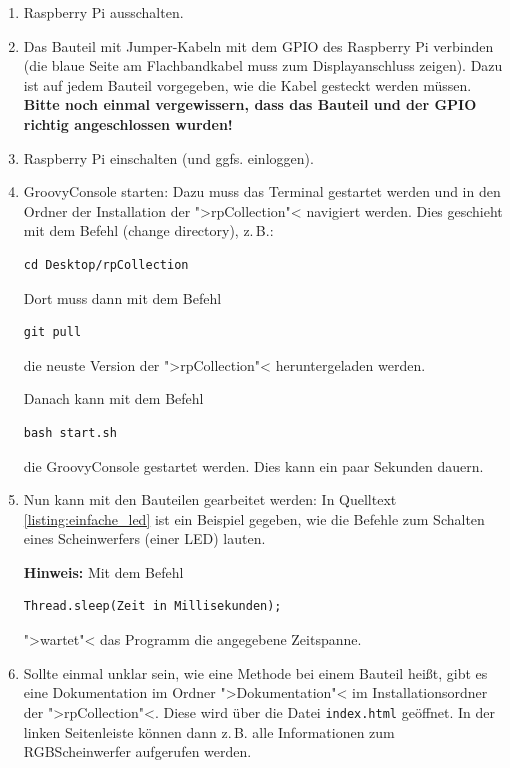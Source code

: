 \documentclass[11pt, a4paper]{article}
\begin{document}
\begin{enumerate}

\item Raspberry Pi ausschalten.

\item Das Bauteil mit Jumper-Kabeln mit dem GPIO des Raspberry Pi verbinden (die blaue Seite am Flachbandkabel muss zum Displayanschluss zeigen). Dazu ist auf jedem Bauteil vorgegeben, wie die Kabel gesteckt werden müssen. \textbf{Bitte noch einmal vergewissern, dass das Bauteil und der GPIO richtig angeschlossen wurden!}

\item Raspberry Pi einschalten (und ggfs. einloggen).

\item GroovyConsole starten: Dazu muss das Terminal gestartet werden und in den Ordner der Installation der ">rpCollection"< navigiert werden. Dies geschieht mit dem Befehl  (change directory), z.\,B.:

\lstset{language=Bash}
\bashstyleoneline 
\begin{lstlisting}
cd Desktop/rpCollection
\end{lstlisting}

Dort muss dann mit dem Befehl 
\begin{lstlisting}
git pull
\end{lstlisting}
die neuste Version der ">rpCollection"< heruntergeladen werden.

Danach kann mit dem Befehl
\lstset{language=Bash}
\bashstyleoneline
\begin{lstlisting}
bash start.sh
\end{lstlisting}
die GroovyConsole gestartet werden. Dies kann ein paar Sekunden dauern.

\item Nun kann mit den Bauteilen gearbeitet werden: In Quelltext \ref{listing:einfache_led} ist ein Beispiel gegeben, wie die Befehle zum Schalten eines Scheinwerfers (einer LED) lauten.

\textbf{Hinweis:} Mit dem Befehl
\lstset{language=Java}
\javastyleoneline
\begin{lstlisting}
Thread.sleep(Zeit in Millisekunden);
\end{lstlisting}
">wartet"< das Programm die angegebene Zeitspanne.

\item Sollte einmal unklar sein, wie eine Methode bei einem Bauteil heißt, gibt es eine Dokumentation im Ordner ">Dokumentation"< im Installationsordner der ">rpCollection"<. Diese wird über die Datei \texttt{index.html} geöffnet. In der linken Seitenleiste können dann z.\,B. alle Informationen zum RGBScheinwerfer aufgerufen werden.  

\end{enumerate}
\end{document}
